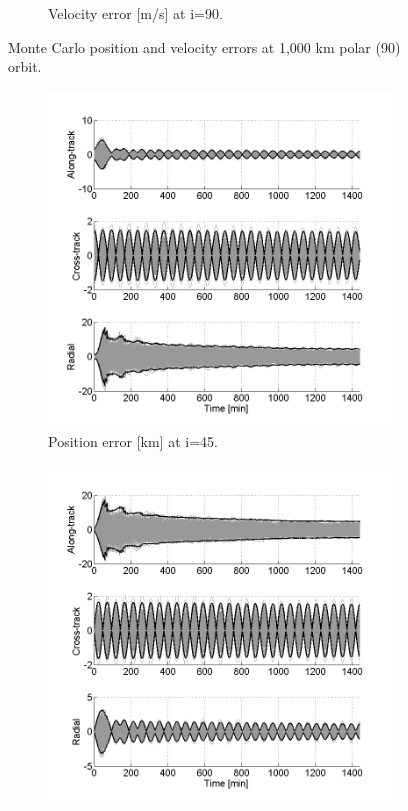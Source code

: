 \documentclass[]{aiaa-tc}%
\begin{document}
\begin{figure}[h!]
\begin{subfigure}{.49\textwidth}
		\caption{Velocity error [m/s] at i=90\degree.}
		\label{fig:mcvel90}
	\end{subfigure}
	\caption{Monte Carlo position and velocity errors at 1,000 km polar (90\degree) orbit.}
	\label{fig:mc90}
\end{figure}
\begin{figure}[h!]
	\centering
	\begin{subfigure}{.49\textwidth}
		\centering
		\includegraphics{MC_pos45_500}
		\caption{Position error [km] at i=45\degree.}
		\label{fig:mcpos45_500}
	\end{subfigure}%
	\begin{subfigure}{.49\textwidth} 
		\centering
		\includegraphics{MC_vel45_500}

\end{subfigure}
\end{figure}
\end{document}
